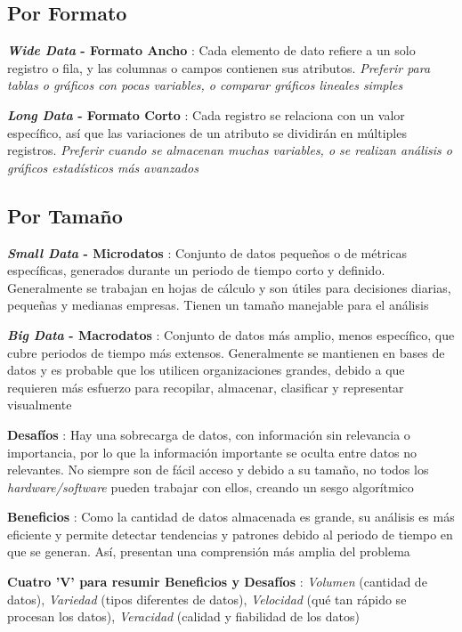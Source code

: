 \subsection{Por Formato}
\begin{description}
    \item {\textbf{\textit{Wide Data} - Formato Ancho} : Cada elemento de dato refiere a un solo registro o fila, y las columnas o campos contienen sus atributos. \textit{Preferir para tablas o gráficos con pocas variables, o comparar gráficos lineales simples}}
    \item {\textbf{\textit{Long Data} - Formato Corto} : Cada registro se relaciona con un valor específico, así que las variaciones de un atributo se dividirán en múltiples registros. \textit{Preferir cuando se almacenan muchas variables, o se realizan análisis o gráficos estadísticos más avanzados}}
\end{description}

\subsection{Por Tamaño}
\begin{description}
    \item {\textbf{\textit{Small Data} - Microdatos} : Conjunto de datos pequeños o de métricas específicas, generados durante un periodo de tiempo corto y definido. Generalmente se trabajan en hojas de cálculo y son útiles para decisiones diarias, pequeñas y medianas empresas. Tienen un tamaño manejable para el análisis}
    \item {\textbf{\textit{Big Data} - Macrodatos} : Conjunto de datos más amplio, menos específico, que cubre periodos de tiempo más extensos. Generalmente se mantienen en bases de datos y es probable que los utilicen organizaciones grandes, debido a que requieren más esfuerzo para recopilar, almacenar, clasificar y representar visualmente
    \begin{description}
        \item {\textbf{Desafíos} : Hay una sobrecarga de datos, con información sin relevancia o importancia, por lo que la información importante se oculta entre datos no relevantes. No siempre son de fácil acceso y debido a su tamaño, no todos los \textit{hardware/software} pueden trabajar con ellos, creando un sesgo algorítmico}
        \item {\textbf{Beneficios} : Como la cantidad de datos almacenada es grande, su análisis es más eficiente y permite detectar tendencias y patrones debido al periodo de tiempo en que se generan. Así, presentan una comprensión más amplia del problema}
        \item {\textbf{Cuatro 'V' para resumir Beneficios y Desafíos} : \textit{Volumen} (cantidad de datos), \textit{Variedad} (tipos diferentes de datos), \textit{Velocidad} (qué tan rápido se procesan los datos), \textit{Veracidad} (calidad y fiabilidad de los datos)}
    \end{description}}
\end{description}
\newpage